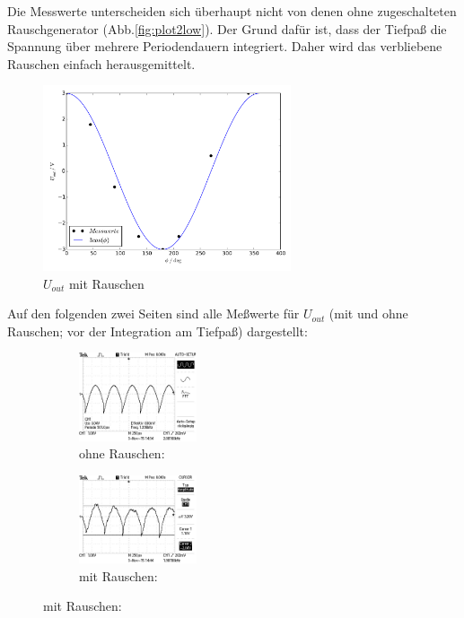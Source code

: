 Die Messwerte unterscheiden sich
überhaupt nicht von denen ohne zugeschalteten
Rauschgenerator (Abb.\ref{fig:plot2low}).
Der Grund dafür ist, dass der Tiefpaß die Spannung über mehrere
Periodendauern integriert. Daher wird das verbliebene Rauschen einfach
herausgemittelt.
\begin{figure}[H]
  \centering
  \includegraphics[width=0.65\textwidth, height=0.35\textwidth]{plot3low.pdf}
  \caption{$U_{out}$ mit Rauschen}
  \label{fig:plot3low}
\end{figure}
Auf den folgenden zwei Seiten sind alle Meßwerte für $U_{out}$
(mit und ohne Rauschen; vor der Integration am Tiefpaß) dargestellt:
\newpage
\noindent
\captionsetup{labelformat=empty}
\begin{figure}[H]
  \caption*{$U_{out} ( \phi = 0°$) }
  \centering
  \begin{subfigure}{0.48\textwidth}
      \centering
      \caption*{ohne Rauschen:}
      \includegraphics[angle=90,height=2.6cm]{graphics/ALL0031/F0031TEK.jpg}
  \end{subfigure}
  \begin{subfigure}{0.48\textwidth}
      \centering
      \caption*{mit Rauschen:}
      \includegraphics[angle=90,height=2.6cm]{graphics/ALL0039/F0039TEK.jpg}
  \end{subfigure}
\end{figure}
\addtocounter{figure}{-1}
